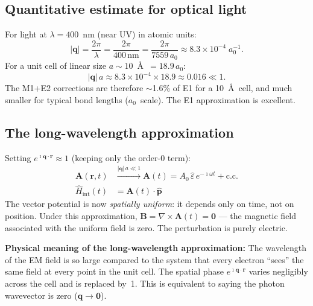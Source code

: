 \documentclass[11pt]{article}
\newcommand{\iunit}{\imath}          %
\newcommand{\Avec}{\mathbf{A}}
\newcommand{\Bvec}{\mathbf{B}}
\newcommand{\phat}{\hat{\mathbf{p}}}
\begin{document}
\subsection{Quantitative estimate for optical light}

For light at $\lambda = 400$~nm (near UV) in atomic units:
\begin{equation}
  |\mathbf{q}|
  = \frac{2\pi}{\lambda}
  = \frac{2\pi}{400\,\mathrm{nm}}
  = \frac{2\pi}{7559\,a_0}
  \approx 8.3\times10^{-4}\;a_0^{-1}.
\end{equation}
For a unit cell of linear size $a \sim 10$~\AA\ $= 18.9\,a_0$:
\begin{equation}
  |\mathbf{q}|\,a \approx 8.3\times10^{-4}\times18.9
  \approx 0.016 \ll 1.
\end{equation}
The M1+E2 corrections are therefore $\sim$1.6\% of E1 for a
10~\AA\ cell, and much smaller for typical bond lengths
($a_0$~scale).
The E1 approximation is excellent.

\subsection{The long-wavelength approximation}

Setting $e^{\iunit\mathbf{q}\cdot\mathbf{r}}\approx 1$ (keeping
only the order-0 term):
\begin{align}
  \Avec(\mathbf{r},t)
  &\xrightarrow{|\mathbf{q}|\,a\ll 1}
  \Avec(t)
  = A_0\,\hat{\varepsilon}\,e^{-\iunit\omega t}+\text{c.c.}
  \label{eq:A-uniform}
  \\[4pt]
  \hat{H}_\mathrm{int}(t)
  &= \Avec(t)\cdot\phat
  \label{eq:Hint-LWA}
\end{align}
The vector potential is now \emph{spatially uniform}: it depends
only on time, not on position.
Under this approximation, $\Bvec = \nabla\times\Avec(t) = \mathbf{0}$
--- the magnetic field associated with the uniform field is zero.
The perturbation is purely electric.

\begin{keyresult}
\textbf{Physical meaning of the long-wavelength approximation:}
The wavelength of the EM field is so large compared to the
system that every electron ``sees'' the same field at every
point in the unit cell.
The spatial phase $e^{\iunit\mathbf{q}\cdot\mathbf{r}}$ varies
negligibly across the cell and is replaced by~1.
This is equivalent to saying the photon wavevector is zero
($\mathbf{q}\to\mathbf{0}$).
\end{keyresult}
\end{document}
